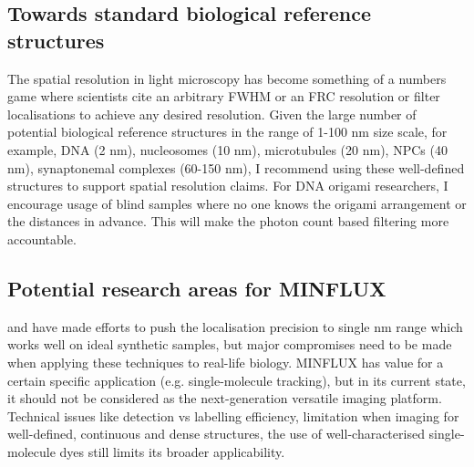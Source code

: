 \documentclass[9pt,twocolumn,twoside]{pnas-new}
\begin{document}
\subsection{Towards standard biological reference structures}
The spatial resolution in light microscopy has become something of a numbers game where scientists cite an arbitrary FWHM or an FRC resolution or filter localisations to achieve any desired resolution. Given the large number of potential biological reference structures in the range of 1-100 nm size scale, for example, DNA (2 nm), nucleosomes (10 nm), microtubules (20 nm), NPCs (40 nm), synaptonemal complexes (60-150 nm), I recommend using these well-defined structures to support spatial resolution claims. For DNA origami researchers, I encourage usage of blind samples where no one knows the origami arrangement or the distances in advance. This will make the photon count based filtering  more accountable. 

\subsection{Potential research areas for MINFLUX}
\cite{gwosch2020minflux} and \cite{balzarotti2017nanometer} have made efforts to push the localisation precision to single nm range which works well on ideal synthetic samples, but major compromises need to be made when applying these techniques to real-life biology. MINFLUX has value for a certain specific application (e.g. single-molecule tracking), but in its current state, it should not be considered as the next-generation versatile imaging platform. Technical issues like detection vs labelling efficiency, limitation when imaging for well-defined, continuous and dense structures, the use of well-characterised single-molecule dyes still limits its broader applicability. 
\end{document}
